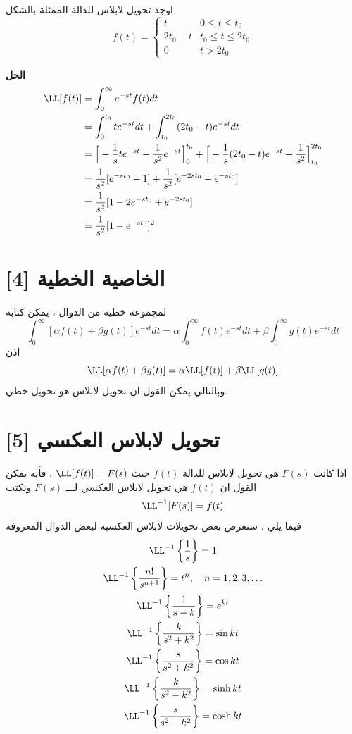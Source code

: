 \begin{example}
	اوجد تحويل لابلاس للدالة الممثلة بالشكل
	\[
	f(t) = 
	\begin{cases}
		t & 0 \leq t \leq t_0 \\
		2t_0 - t & t_0 \leq t \leq 2t_0\\
		0 & t > 2t_0
	\end{cases} 
	\]
\end{example}
\noindent
\textbf{الحل}
\begin{align*}
	\LL[f(t)] &= \int_{0}^{\infty} e^{-st} f(t)dt\\
	&= \int_{0}^{t_0} te^{-st}dt + \int_{t_0}^{2t_0} (2t_0 - t)e^{-st}dt\\
	&= \Big[-\frac{1}{s} te^{-st} - \frac{1}{s^2} e^{-st}\Big]^{t_0}_0  + \Big[- \frac{1}{s}(2t_0 - t)e^{-st} + \frac{1}{s^2} \Big]^{2t_0}_{t_0}\\
	&= \frac{1}{s^2}[e^{-st_0} -1] + \frac{1}{s^2} [e^{-2st_0} - e^{-st_0}]\\
	&= \frac{1}{s^2} [ 1-2e^{-st_0} + e^{-2st_0}]\\
	&= \frac{1}{s^2} [1-e^{-st_0}]^2 
\end{align*}

\newpage
\section[الخاصية الخطية]{الخاصية الخطية [4]}
لمجموعة خطية من الدوال ، يمكن كتابة 
\begin{equation}
\int_{0}^{\infty} [\alpha f(t) + \beta g(t)] e^{-st} dt = \alpha \int_{0}^{\infty}  f(t)e^{-st} dt + \beta \int_{0}^{\infty} g(t) e^{-st} dt
 \end{equation}
 اذن
 \begin{equation}
 	\LL[\alpha f(t) + \beta g(t)] = \alpha \LL[f(t)] + \beta \LL[g(t)]
 \end{equation}
 وبالتالي يمكن القول ان تحويل لابلاس هو تحويل خطي.
 
 \section[تحويل لابلاس العكسي]{تحويل لابلاس العكسي [5]} 
 اذا كانت $F(s)$ هي تحويل لابلاس للدالة $f(t)$ حيث $\LL[f(t)] = F(s)$ ، فأنه يمكن القول ان $f(t)$ هي تحويل لابلاس العكسي لـــ $F(s)$ ونكتب 
\begin{equation}
	 \LL^{-1} [F(s)] = f(t)
\end{equation}
 فيما يلي ، سنعرض بعض تحويلات لابلاس العكسية لبعض الدوال المعروفة
 \begin{gather}
 	\LL^{-1} \left\{\frac{1}{s}\right\} = 1\\
 	\LL^{-1}\left\{ \frac{n!}{s^{n+1}}\right\} = t^n , \quad n=1,2,3,\dots\\
 	\LL^{-1}\left\{\frac{1}{s-k}\right\} = e^{kt}\\
 	\LL^{-1}\left\{\frac{k}{s^2 + k^2}\right\} = \sin kt\\
 	\LL^{-1}\left\{\frac{s}{s^2 + k^2}\right\} = \cos kt\\
 	\LL^{-1}\left\{\frac{k}{s^2 - k^2}\right\} = \sinh kt\\
 	\LL^{-1}\left\{\frac{s}{s^2 - k^2}\right\} = \cosh kt
 \end{gather}
 
